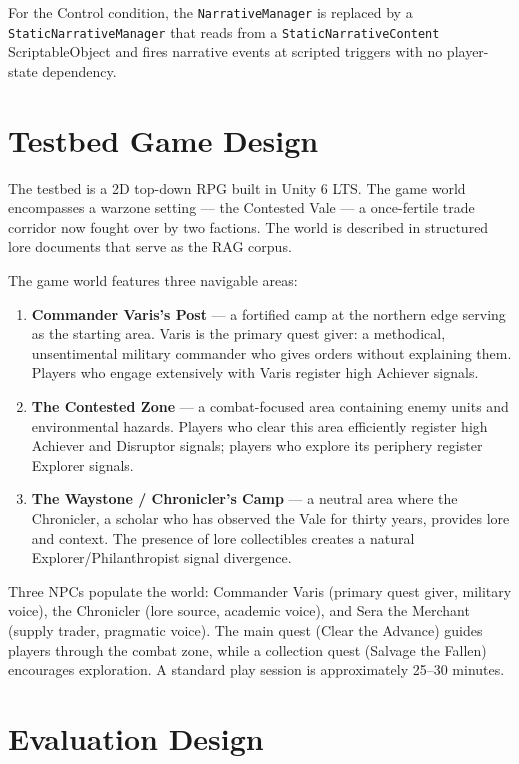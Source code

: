 \documentclass[12pt,a4paper]{report}
\begin{document}
For the Control condition, the \texttt{NarrativeManager} is replaced by a \texttt{StaticNarrativeManager} that reads from a \texttt{StaticNarrativeContent} ScriptableObject and fires narrative events at scripted triggers with no player-state dependency.

\section{Testbed Game Design}

The testbed is a 2D top-down RPG built in Unity 6 LTS. The game world encompasses a warzone setting --- the Contested Vale --- a once-fertile trade corridor now fought over by two factions. The world is described in structured lore documents that serve as the RAG corpus.

The game world features three navigable areas:

\begin{enumerate}
\item \textbf{Commander Varis's Post} --- a fortified camp at the northern edge serving as the starting area. Varis is the primary quest giver: a methodical, unsentimental military commander who gives orders without explaining them. Players who engage extensively with Varis register high Achiever signals.

\item \textbf{The Contested Zone} --- a combat-focused area containing enemy units and environmental hazards. Players who clear this area efficiently register high Achiever and Disruptor signals; players who explore its periphery register Explorer signals.

\item \textbf{The Waystone / Chronicler's Camp} --- a neutral area where the Chronicler, a scholar who has observed the Vale for thirty years, provides lore and context. The presence of lore collectibles creates a natural Explorer/Philanthropist signal divergence.
\end{enumerate}

Three NPCs populate the world: Commander Varis (primary quest giver, military voice), the Chronicler (lore source, academic voice), and Sera the Merchant (supply trader, pragmatic voice). The main quest (Clear the Advance) guides players through the combat zone, while a collection quest (Salvage the Fallen) encourages exploration. A standard play session is approximately 25--30 minutes.

\section{Evaluation Design}
\end{document}
